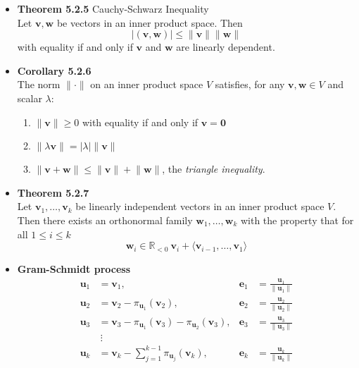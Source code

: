 \documentclass[11pt,a4paper]{article}
\begin{document}
\begin{itemize}
    \item \textbf{Theorem 5.2.5} Cauchy-Schwarz Inequality \\
        Let $\mathbf{v}, \mathbf{w}$ be vectors in an inner product space. Then
        \[
            |(\mathbf{v}, \mathbf{w})| \leq \lVert \mathbf{v} \rVert \lVert \mathbf{w} \rVert
        \]
        with equality if and only if $\mathbf{v}$ and $\mathbf{w}$ are linearly dependent.

    \item \textbf{Corollary 5.2.6} \\
        The norm $\lVert \cdot \rVert$ on an inner product space $V$ satisfies,
        for any $\mathbf{v}, \mathbf{w} \in V$ and scalar $\lambda$:
        \begin{enumerate}
            \item $\lVert \mathbf{v} \rVert \geq 0$ with equality if and only if
                $\mathbf{v} = \mathbf{0}$
            \item $\lVert \lambda \mathbf{v} \rVert = |\lambda| \lVert \mathbf{v} \rVert$
            \item $\lVert \mathbf{v} + \mathbf{w} \rVert \leq
                \lVert \mathbf{v} \rVert + \lVert \mathbf{w} \rVert$,
                the \emph{triangle inequality}.
        \end{enumerate}

    \item \textbf{Theorem 5.2.7} \\
        Let $\mathbf{v}_1, \ldots, \mathbf{v}_k$ be linearly independent vectors in an
        inner product space $V$.
        Then there exists an orthonormal family $\mathbf{w}_1, \ldots, \mathbf{w}_k$
        with the property that for all $1 \leq i \leq k$
        \[
            \mathbf{w}_i \in \mathbb{R}_{<0} \ \mathbf{v}_i +
            \langle \mathbf{v}_{i-1}, \ldots, \mathbf{v}_1 \rangle
        \]

    \item \textbf{Gram-Schmidt process}
        \begin{align*}{}
            \mathbf{u}_1 &= \mathbf{v}_1, & \mathbf{e}_1
                         &= \frac{\mathbf{u}_1}{\lVert \mathbf{u}_1 \rVert} \\
            \mathbf{u}_2 &= \mathbf{v}_2 - \pi_{\mathbf{u}_1}(\mathbf{v}_2), & \mathbf{e}_2
                         &= \frac{\mathbf{u}_2}{\lVert \mathbf{u}_2 \rVert} \\
            \mathbf{u}_3 &= \mathbf{v}_3 - \pi_{\mathbf{u}_1}(\mathbf{v}_3) -
            \pi_{\mathbf{u}_2}(\mathbf{v}_3), & \mathbf{e}_3 &=
            \frac{\mathbf{u}_3}{\lVert \mathbf{u}_3 \rVert} \\
            & \ \vdots \\
            \mathbf{u}_k &= \mathbf{v}_k - \sum_{j=1}^{k-1} \pi_{\mathbf{u}_j} (\mathbf{v}_k),
                         & \mathbf{e}_k &= \frac{\mathbf{u}_k}{\lVert \mathbf{u}_k \rVert}
        \end{align*}

\end{itemize}
\end{document}
